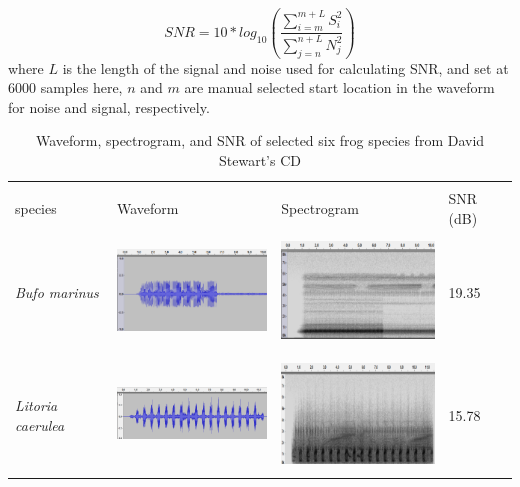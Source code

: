 \begin{equation}
SNR=10*log_{10}(\frac{\sum_{i=m}^{m+L}S_{i}^2}{\sum_{j=n}^{n+L}N_{j}^2})
\end{equation}
where $L$ is the length of the signal and noise used for calculating SNR, and set at 6000 samples here, $n$ and $m$ are manual selected start location in the waveform for noise and signal, respectively. 



\begin{table}[htb!]
\centering
\caption[Waveform, spectrogram, and SNR of CD]{Waveform, spectrogram, and SNR of selected six frog species from David Stewart's CD}
\label{tab:wav_spec_cd}
\begin{tabular}{llll}
\hline\hline
\backslashbox{Frog \\ species}{}        & Waveform & Spectrogram & SNR (dB)   \\ \hline
\textit{Bufo marinus}        &   
\begin{minipage}{.3\textwidth} \includegraphics[width=45mm, height=30mm]{image/Ch1/toad_wave.png}  \end{minipage}    &   \begin{minipage}{.3\textwidth} \includegraphics[width=45mm, height=30mm]{image/Ch1/toad_spec.png}  \end{minipage}          & 19.35 \\ \hline
\textit{Litoria caerulea}    &  \begin{minipage}{.3\textwidth} \includegraphics[width=45mm, height=30mm]{image/Ch1/caerulea_wav.png}  \end{minipage}      &     \begin{minipage}{.3\textwidth} \includegraphics[width=45mm, height=30mm]{image/Ch1/caerulea_spec.png}   \end{minipage}     & 15.78 \\ \hline

\end{tabular}
\end{table}
